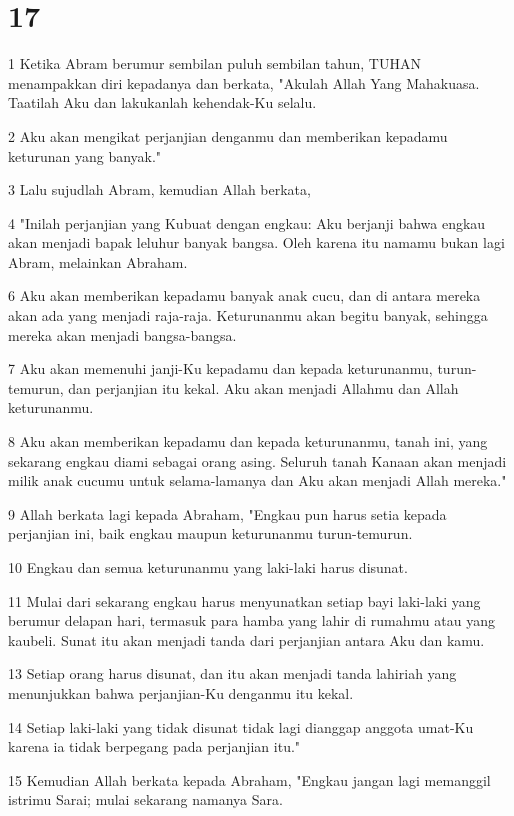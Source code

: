 \chapter{17}

\par 1 Ketika Abram berumur sembilan puluh sembilan tahun, TUHAN menampakkan diri kepadanya dan berkata, "Akulah Allah Yang Mahakuasa. Taatilah Aku dan lakukanlah kehendak-Ku selalu.
\par 2 Aku akan mengikat perjanjian denganmu dan memberikan kepadamu keturunan yang banyak."
\par 3 Lalu sujudlah Abram, kemudian Allah berkata,
\par 4 "Inilah perjanjian yang Kubuat dengan engkau: Aku berjanji bahwa engkau akan menjadi bapak leluhur banyak bangsa. Oleh karena itu namamu bukan lagi Abram, melainkan Abraham.
\par 6 Aku akan memberikan kepadamu banyak anak cucu, dan di antara mereka akan ada yang menjadi raja-raja. Keturunanmu akan begitu banyak, sehingga mereka akan menjadi bangsa-bangsa.
\par 7 Aku akan memenuhi janji-Ku kepadamu dan kepada keturunanmu, turun-temurun, dan perjanjian itu kekal. Aku akan menjadi Allahmu dan Allah keturunanmu.
\par 8 Aku akan memberikan kepadamu dan kepada keturunanmu, tanah ini, yang sekarang engkau diami sebagai orang asing. Seluruh tanah Kanaan akan menjadi milik anak cucumu untuk selama-lamanya dan Aku akan menjadi Allah mereka."
\par 9 Allah berkata lagi kepada Abraham, "Engkau pun harus setia kepada perjanjian ini, baik engkau maupun keturunanmu turun-temurun.
\par 10 Engkau dan semua keturunanmu yang laki-laki harus disunat.
\par 11 Mulai dari sekarang engkau harus menyunatkan setiap bayi laki-laki yang berumur delapan hari, termasuk para hamba yang lahir di rumahmu atau yang kaubeli. Sunat itu akan menjadi tanda dari perjanjian antara Aku dan kamu.
\par 13 Setiap orang harus disunat, dan itu akan menjadi tanda lahiriah yang menunjukkan bahwa perjanjian-Ku denganmu itu kekal.
\par 14 Setiap laki-laki yang tidak disunat tidak lagi dianggap anggota umat-Ku karena ia tidak berpegang pada perjanjian itu."
\par 15 Kemudian Allah berkata kepada Abraham, "Engkau jangan lagi memanggil istrimu Sarai; mulai sekarang namanya Sara.
